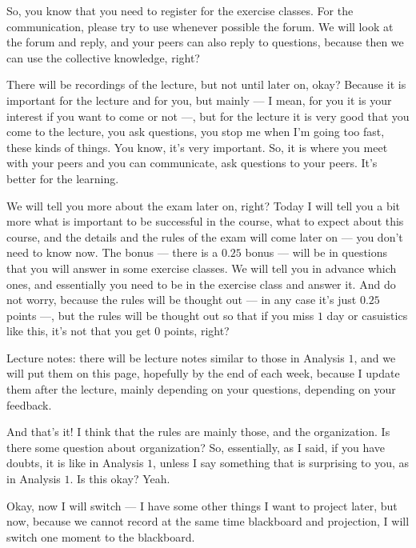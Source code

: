 \begin{spoken-clean}[00:02:30 - 00:05:07]
So, you know that you need to register for the exercise classes. For the communication, please try to use whenever possible the forum. We will look at the forum and reply, and your peers can also reply to questions, because then we can use the collective knowledge, right?

There will be recordings of the lecture, but not until later on, okay? Because it is important for the lecture and for you, but mainly --- I mean, for you it is your interest if you want to come or not ---, but for the lecture it is very good that you come to the lecture, you ask questions, you stop me when I'm going too fast, these kinds of things. You know, it's very important. So, it is where you meet with your peers and you can communicate, ask questions to your peers. It's better for the learning.

We will tell you more about the exam later on, right? Today I will tell you a bit more what is important to be successful in the course, what to expect about this course, and the details and the rules of the exam will come later on --- you don't need to know now. The bonus --- there is a $0.25$ bonus --- will be in questions that you will answer in some exercise classes. We will tell you in advance which ones, and essentially you need to be in the exercise class and answer it. And do not worry, because the rules will be thought out --- in any case it's just $0.25$ points ---, but the rules will be thought out so that if you miss $1$ day or casuistics like this, it's not that you get $0$ points, right?

Lecture notes: there will be lecture notes similar to those in Analysis $1$, and we will put them on this page, hopefully by the end of each week, because I update them after the lecture, mainly depending on your questions, depending on your feedback.

And that's it! I think that the rules are mainly those, and the organization. Is there some question about organization? So, essentially, as I said, if you have doubts, it is like in Analysis $1$, unless I say something that is surprising to you, as in Analysis $1$. Is this okay? Yeah.

Okay, now I will switch --- I have some other things I want to project later, but now, because we cannot record at the same time blackboard and projection, I will switch one moment to the blackboard.
\end{spoken-clean}


